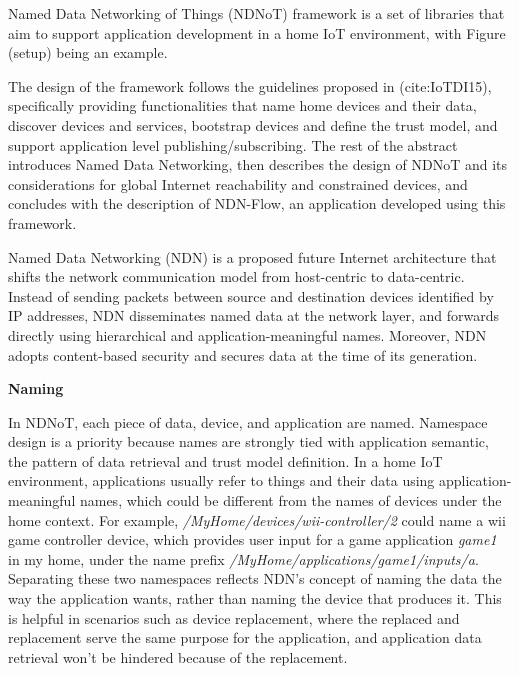 \documentclass{sig-alternate-05-2015}
\begin{document}


%
%

%
%




Named Data Networking of Things (NDNoT) framework is a set of libraries that aim to support application development in a home IoT environment, with Figure (setup) being an example.

The design of the framework follows the guidelines proposed in (cite:IoTDI15), specifically providing functionalities that name home devices and their data, discover devices and services, bootstrap devices and define the trust model, and support application level publishing/subscribing. The rest of the abstract introduces Named Data Networking, then describes the design of NDNoT and its considerations for global Internet reachability and constrained devices, and concludes with the description of NDN-Flow, an application developed using this framework.

Named Data Networking (NDN) is a proposed future Internet architecture that shifts the network communication model from host-centric to data-centric. Instead of sending packets between source and destination devices identified by IP addresses, NDN disseminates named data at the network layer, and forwards directly using hierarchical and application-meaningful names. Moreover, NDN adopts content-based security and secures data at the time of its generation.

\textbf{Naming}

In NDNoT, each piece of data, device, and application are named. Namespace design is a priority because names are strongly tied with application semantic, the pattern of data retrieval and trust model definition. In a home IoT environment, applications usually refer to things and their data using application-meaningful names, which could be different from the names of devices under the home context. For example, \textit{/MyHome/devices/wii-controller/2} could name a wii game controller device, which provides user input for a game application \textit{game1} in my home, under the name prefix \textit{/MyHome/applications/game1/inputs/a}. Separating these two namespaces reflects NDN's concept of naming the data the way the application wants, rather than naming the device that produces it. This is helpful in scenarios such as device replacement, where the replaced and replacement serve the same purpose for the application, and application data retrieval won't be hindered because of the replacement.
\end{document}
